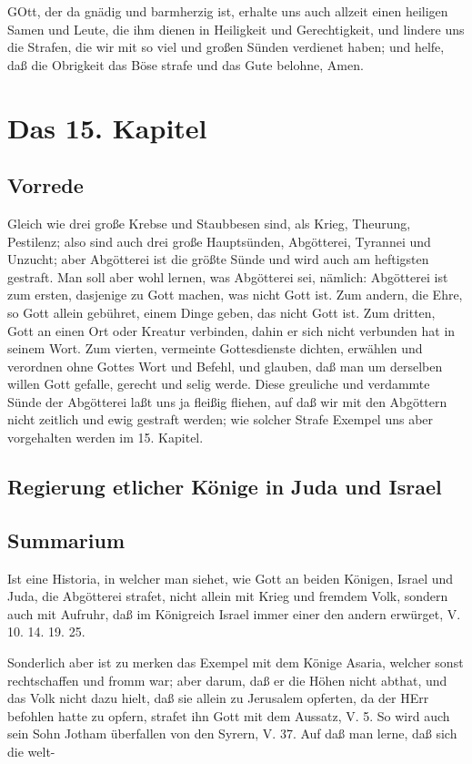 GOtt, der da gnädig und barmherzig ist, erhalte uns auch allzeit einen heiligen Samen und Leute, die ihm dienen in Heiligkeit und Gerechtigkeit, und lindere uns die Strafen, die wir mit so viel und großen Sünden verdienet haben; und helfe, daß die Obrigkeit das Böse strafe und das Gute belohne, Amen.

\chapter{Das 15. Kapitel}

\section{Vorrede}

Gleich wie drei große Krebse und Staubbesen sind, als Krieg, Theurung, Pestilenz; also sind auch drei große Hauptsünden, Abgötterei, Tyrannei und Unzucht; aber Abgötterei ist die größte Sünde und wird auch am heftigsten gestraft. Man soll aber wohl lernen, was Abgötterei sei, nämlich: Abgötterei ist zum ersten, dasjenige zu Gott machen, was nicht Gott ist. Zum andern, die Ehre, so Gott allein gebühret, einem Dinge geben, das nicht Gott ist. Zum dritten, Gott an einen Ort oder Kreatur verbinden, dahin er sich nicht verbunden hat in seinem Wort. Zum vierten, vermeinte Gottesdienste dichten, erwählen und verordnen ohne Gottes Wort und Befehl, und glauben, daß man um derselben willen Gott gefalle, gerecht und selig werde. Diese greuliche und verdammte Sünde der Abgötterei laßt uns ja fleißig fliehen, auf daß wir mit den Abgöttern nicht zeitlich und ewig gestraft werden; wie solcher Strafe Exempel uns aber vorgehalten werden im 15. Kapitel.

\section{Regierung etlicher Könige in Juda und Israel}

\section{Summarium}

Ist eine Historia, in welcher man siehet, wie Gott an beiden Königen, Israel und Juda, die Abgötterei strafet, nicht allein mit Krieg und fremdem Volk, sondern auch mit Aufruhr, daß im Königreich Israel immer einer den andern erwürget, V. 10. 14. 19. 25.

Sonderlich aber ist zu merken das Exempel mit dem Könige Asaria, welcher sonst rechtschaffen und fromm war; aber darum, daß er die Höhen nicht abthat, und das Volk nicht dazu hielt, daß sie allein zu Jerusalem opferten, da der HErr befohlen hatte zu opfern, strafet ihn Gott mit dem Aussatz, V. 5. So wird auch sein Sohn Jotham überfallen von den Syrern, V. 37. Auf daß man lerne, daß sich die welt-


